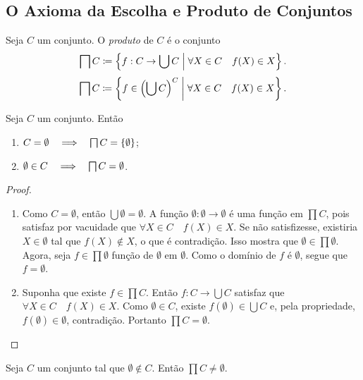 \subsection*{O Axioma da Escolha e Produto de Conjuntos}

\begin{defi}
Seja $C$ um conjunto. O \emph{produto} de $C$ é o conjunto
	\begin{equation*}
	\prod C \coloneqq \set{f: C \to \bigcup C }{\forall X \in C \quad f(X) \in X}.
	\end{equation*}
	\begin{equation*}
	\prod C \coloneqq \set{f \in \left(\bigcup C\right)^C }{\forall X \in C \quad f(X) \in X}.
	\end{equation*}
\end{defi}

\begin{prop}
Seja $C$ um conjunto. Então
	\begin{enumerate}
	\item $C = \emptyset \entao \prod C = \{\emptyset\}$;
	\item $\emptyset \in C \entao \prod C = \emptyset$.
	\end{enumerate}
\end{prop}
\begin{proof}
	\begin{enumerate}
	\item Como $C=\emptyset$, então $\bigcup \emptyset = \emptyset$. A função $\emptyset: \emptyset \to \emptyset$ é uma função em $\prod C$, pois satisfaz por vacuidade que $\forall X \in C \quad f(X) \in X$. Se não satisfizesse, existiria $X \in \emptyset$ tal que $f(X) \notin X$, o que é contradição. Isso mostra que $\emptyset \in \prod \emptyset$. Agora, seja $f \in \prod \emptyset$ função de $\emptyset$ em $\emptyset$. Como o domínio de $f$ é $\emptyset$, segue que $f=\emptyset$.
	
	\item Suponha que existe $f \in \prod C$. Então $f: C \to \bigcup C$ satisfaz que $\forall X \in C \quad f(X) \in X$. Como $\emptyset \in C$, existe $f(\emptyset) \in \bigcup C$ e, pela propriedade, $f(\emptyset) \in \emptyset$, contradição. Portanto $\prod C = \emptyset$.
	\end{enumerate}
\end{proof}

\begin{axi}[Escolha]
Seja $C$ um conjunto tal que $\emptyset \notin C$. Então $\prod C \neq \emptyset$.
\end{axi}



